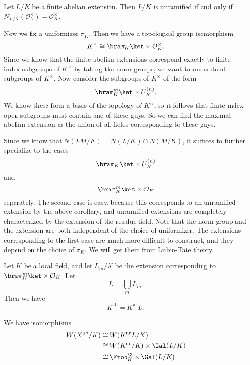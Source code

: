 \documentclass[a4paper]{article}
\begin{document}
\begin{cor}
  Let $L/K$ be a finite abelian extension. Then $L/K$ is unramified if and only if $N_{L/K}(\mathcal{O}_L^\times) = \mathcal{O}_K^\times$.
\end{cor}

Now we fix a uniformizer $\pi_K$. Then we have a topological group isomorphism
\[
  K^\times \cong \bra \pi_K\ket \times \mathcal{O}_K^\times.
\]
Since we know that the finite abelian extensions correspond exactly to finite index subgroups of $K^\times$ by taking the norm groups, we want to understand subgroups of $K^\times$. Now consider the subgroups of $K^\times$ of the form
\[
  \bra \pi_K^m\ket \times U_K^{(n)}.
\]
We know these form a basis of the topology of $K^\times$, so it follows that finite-index open subgroups must contain one of these guys. So we can find the maximal abelian extension as the union of all fields corresponding to these guys.

Since we know that $N(LM/K) = N(L/K) \cap N(M/K)$, it suffices to further specialize to the cases
\[
  \bra \pi_K\ket \times U_K^{(n)}
\]
and
\[
  \bra \pi_K^m\ket \times \mathcal{O}_K
\]
separately. The second case is easy, because this corresponds to an unramified extension by the above corollary, and unramified extensions are completely characterized by the extension of the residue field. Note that the norm group and the extension are both independent of the choice of uniformizer. The extensions corresponding to the first case are much more difficult to construct, and they depend on the choice of $\pi_K$. We will get them from Lubin-Tate theory.%

\begin{lemma}
  Let $K$ be a local field, and let $L_m/K$ be the extension corresponding to $\bra \pi_K^m \ket \times \mathcal{O}_K$. Let
  \[
    L = \bigcup_m L_m. %
  \]
  Then we have
  \[
    K^{\mathrm{ab}} = K^{\mathrm{ur}}L,
  \]
\end{lemma}

\begin{lemma}
  We have isomorphisms
  \begin{align*}
    W(K^{\mathrm{ab}}/K) &\cong W(K^{\mathrm{ur}} L/K) \\
    &\cong W(K^{\mathrm{ur}}/K) \times \Gal(L/K)\\
    &\cong \Frob_K^\Z \times \Gal(L/K)
  \end{align*}
\end{lemma}
\end{document}
